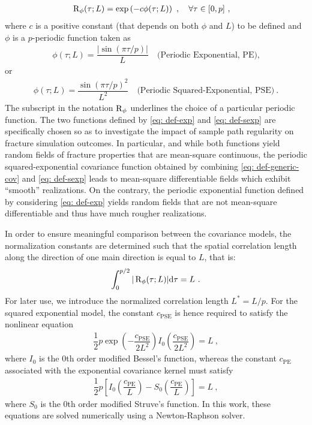 \begin{align}
  \operatorname{R}_\phi(\tau; L) & = \exp\left( -c \phi(\tau; L)\right )~, \quad \forall \tau \in [0,p]~, \label{eq: def-generic-cov}
\end{align}
where $c$ is a positive constant (that depends on both $\phi$ and $L$) to be defined and $\phi$ is a $p$-periodic function taken as
\begin{align}
  \phi(\tau; L) = \dfrac{|\sin\left( \pi\tau/p \right)|}{L} \quad \text{(Periodic Exponential, PE),} \label{eq: def-exp}
\end{align}
or
\begin{align}
  \phi(\tau; L) = \dfrac{\sin\left( \pi\tau/p \right)^2}{L^2} \quad \text{(Periodic Squared-Exponential, PSE)}~. \label{eq: def-sexp}
\end{align}
The subscript in the notation $\operatorname{R}_\phi$ underlines the choice of a particular periodic function. The two functions defined by \eqref{eq: def-exp} and \eqref{eq: def-sexp} are specifically chosen so as to investigate the impact of sample path regularity on fracture simulation outcomes. In particular, and while both functions yield random fields of fracture properties that are mean-square continuous, the periodic squared-exponential covariance function obtained by combining \eqref{eq: def-generic-cov} and \eqref{eq: def-sexp} leads to mean-square differentiable fields which exhibit ``smooth'' realizations. On the contrary, the periodic exponential function defined by considering \eqref{eq: def-exp} yields random fields that are not mean-square differentiable and thus have much rougher realizations.

In order to ensure meaningful comparison between the covariance models, the normalization constants are determined such that the spatial correlation length along the direction of one main direction is equal to $L$, that is:
\begin{align}
  \int_0^{p/2} |\operatorname{R}_\phi(\tau; L)| \mathrm{d}\tau = L~.
\end{align}
For later use, we introduce the normalized correlation length $L^* = L/p$. For the squared exponential model, the constant $c^{}_\text{PSE}$ is hence required to satisfy the nonlinear equation
\begin{align}
  \dfrac{1}{2}p\exp\left( -\dfrac{c^{}_\text{PSE}}{2L^2} \right)I_0(\dfrac{c^{}_\text{PSE}}{2L^2}) = L~, \label{eq: pse normalization}
\end{align}
where $I_0$ is the 0th order modified Bessel's function, whereas the constant $c^{}_\text{PE}$ associated with the exponential covariance kernel must satisfy
\begin{align}
  \dfrac{1}{2}p\left[ I_0\left(\dfrac{c^{}_\text{PE}}{L}\right) - S_0\left(\dfrac{c^{}_\text{PE}}{L}\right) \right] = L~, \label{eq: se normalization}
\end{align}
where $S_0$ is the 0th order modified Struve's function.
In this work, these equations are solved numerically using a Newton-Raphson solver.

